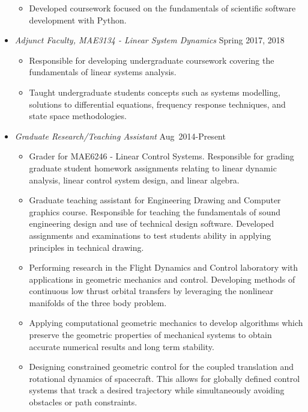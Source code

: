 \begin{itemize}
\begin{itemize}
                \item Developed coursework focused on the fundamentals of scientific software development with Python.
            \end{itemize}
        \item[] \textit{Adjunct Faculty, MAE3134 - Linear System Dynamics} \hfill {Spring 2017, 2018}
        \begin{itemize}
            \item Responsible for developing undergraduate coursework covering the fundamentals of linear systems analysis.
            \item Taught undergraduate students concepts such as systems modelling, solutions to differential equations, frequency response techniques, and state space methodologies. 
        \end{itemize}
        \item[] \textit{Graduate Research/Teaching Assistant} \hfill {Aug~2014-Present}
        \begin{itemize}
            \item Grader for MAE6246 - Linear Control Systems. 
            Responsible for grading graduate student homework assignments relating to linear dynamic analysis, linear control system design, and linear algebra. 
            \item Graduate teaching assistant for Engineering Drawing and Computer graphics course.
            Responsible for teaching the fundamentals of sound engineering design and use of technical design software.
            Developed assignments and examinations to test students ability in applying principles in technical drawing.
            \item Performing research in the Flight Dynamics and Control laboratory with applications in geometric mechanics and control. 
            Developing methods of continuous low thrust orbital transfers by leveraging the nonlinear manifolds of the three body problem.
            \item Applying computational geometric mechanics to develop algorithms which preserve the geometric properties of mechanical systems to obtain accurate numerical results and long term stability.
            \item Designing constrained geometric control for the coupled translation and rotational dynamics of spacecraft.
            This allows for globally defined control systems that track a desired trajectory while simultaneously avoiding obstacles or path constraints.

\end{itemize}
\end{itemize}
